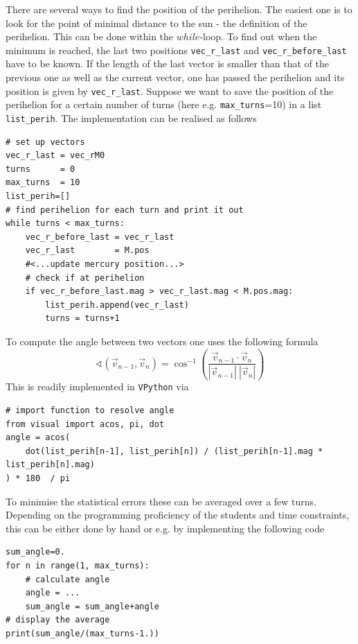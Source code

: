 \documentclass[12pt]{iopart}
\begin{document}
There are several ways to find the position of the perihelion. The easiest one is to look for the point of minimal distance to the sun -  the definition of the perihelion. This can be done within the $while$-loop. 
To find out when the minimum is reached, the last two positions \texttt{vec\_r\_last} and \texttt{vec\_r\_before\_last} have to be known. If the length of the last vector is smaller than that of the previous one as well as the current vector, one has passed the perihelion and its position is given by \texttt{vec\_r\_last}. Suppose we want to save the position of the perihelion for a certain number of turns (here e.g. \texttt{max\_turns}=10) in a list \texttt{list\_perih}. 
The implementation can be realised as follows 
\begin{lstlisting}
# set up vectors
vec_r_last = vec_rM0
turns      = 0
max_turns  = 10
list_perih=[]
# find perihelion for each turn and print it out
while turns < max_turns:
	vec_r_before_last = vec_r_last
	vec_r_last        = M.pos
	#<...update mercury position...>
	# check if at perihelion
	if vec_r_before_last.mag > vec_r_last.mag < M.pos.mag:
		list_perih.append(vec_r_last)
		turns = turns+1
\end{lstlisting}
To compute the angle between two vectors one uses the following
formula
 \begin{equation}
 	\sphericalangle(\vec{v}_{n-1},\vec{v}_n) = \cos^{-1} \left( \frac{\vec{v}_{n-1} \cdot \vec{v}_n}{|\vec{v}_{n-1}|\:|\vec{v}_n|} \right)
 \end{equation}
This is readily implemented in \texttt{VPython} via
\begin{lstlisting}
# import function to resolve angle
from visual import acos, pi, dot
angle = acos(
	dot(list_perih[n-1], list_perih[n]) / (list_perih[n-1].mag * list_perih[n].mag) 
) * 180  / pi
\end{lstlisting}
To minimise the statistical errors these can be averaged over a few turns. Depending on the programming proficiency of the students and time constraints, this can be either done by hand or e.g. by implementing the following code
\begin{lstlisting}
sum_angle=0.
for n in range(1, max_turns):
    # calculate angle
    angle = ...
    sum_angle = sum_angle+angle
# display the average
print(sum_angle/(max_turns-1.))
\end{lstlisting}
\end{document}
